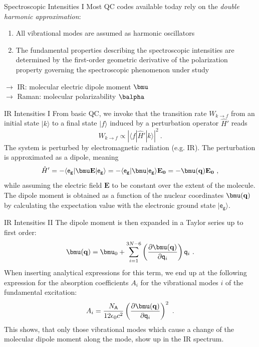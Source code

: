 \documentclass[t]{beamer}
\begin{document}
\begin{frame}{Spectroscopic Intensities I}
	Most QC codes available today rely on the \textit{double harmonic approximation}:
	\begin{enumerate}
		\item All vibrational modes are assumed as harmonic oscillators
		\item The fundamental properties describing the spectroscopic intensities are determined by the first-order geometric derivative of the polarization property governing the spectroscopic phenomenon under study \\
	\end{enumerate}
	$\longrightarrow$ IR: \pause molecular electric dipole moment $\bmu$ \\
	$\longrightarrow$ Raman: \pause molecular polarizability $\balpha$
\end{frame}
\begin{frame}{IR Intensities I}
	From basic QC, we invoke that the transition rate $W_{k\rightarrow f}$ from an initial state $|k\rangle$ to a final state $|f\rangle$ induced by a perturbation operator $\hat{H}'$ reads \pause
	\begin{equation*}
		W_{k\rightarrow f}\propto \left| \langle f | \hat{H}' | k \rangle \right|^2~.
	\end{equation*}
	The system is perturbed by electromagnetic radiation (e.g. IR). The perturbation is approximated as a dipole, meaning
	\begin{equation*}
		\hat{H}' = - \langle \mathsf{e_g} | \bmu\mathbf{E} | \mathsf{e_g} \rangle
		= - \langle \mathsf{e_g} | \bmu | \mathsf{e_g} \rangle \mathbf{E_0}
		= - \bmu(\mathbf{q}) \mathbf{E_0}~,
	\end{equation*}
	while assuming the electric field $\mathbf{E}$ to be constant over the extent of the molecule. The dipole moment is obtained as a function of the nuclear coordinates $\bmu(\mathbf{q})$ by calculating the expectation value with the electronic ground state $| \mathsf{e_g} \rangle$.
\end{frame}
\begin{frame}{IR Intensities II}
	The dipole moment is then expanded in a Taylor series up to first order:
	\begin{equation*}
		\bmu(\mathbf{q}) = \bmu_0 + \sum_{i=1}^{3N-6} \left( \frac{\partial\bmu(\mathbf{q})}{\partial \mathsf{q}_i} \right) \mathsf{q}_i~.
	\end{equation*}
	When inserting analytical expressions for this term, we end up at the following expression for the absorption coefficients $A_i$ for the vibrational modes $i$ of the fundamental excitation:
	\begin{equation*}
		A_i = \frac{N_\mathsf{A}}{12\epsilon_0c^2} \left( \frac{\partial\bmu(\mathbf{q})}{\partial \mathsf{q}_i} \right)^2~.
	\end{equation*}
	This shows, that only those vibrational modes which cause a change of the molecular dipole moment along the mode, show up in the IR spectrum.
\end{frame}
\end{document}
